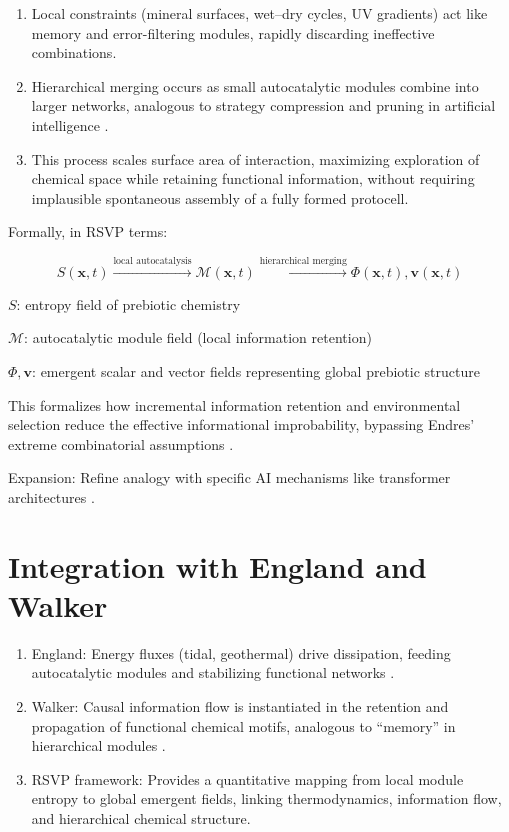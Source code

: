 \documentclass[openany]{book}
\begin{document}
\begin{enumerate}
\item Local constraints (mineral surfaces, wet–dry cycles, UV gradients) act like memory and error-filtering modules, rapidly discarding ineffective combinations.
\item Hierarchical merging occurs as small autocatalytic modules combine into larger networks, analogous to strategy compression and pruning in artificial intelligence \citep{scalinghypothesis}.
\item This process scales surface area of interaction, maximizing exploration of chemical space while retaining functional information, without requiring implausible spontaneous assembly of a fully formed protocell.
\end{enumerate}

Formally, in RSVP terms:

\[S(\mathbf{x}, t) \xrightarrow{\text{local autocatalysis}} \mathcal{M}(\mathbf{x}, t) \xrightarrow{\text{hierarchical merging}} \Phi(\mathbf{x}, t), \mathbf{v}(\mathbf{x}, t)\]

$S$: entropy field of prebiotic chemistry

$\mathcal{M}$: autocatalytic module field (local information retention)

$\Phi, \mathbf{v}$: emergent scalar and vector fields representing global prebiotic structure

This formalizes how incremental information retention and environmental selection reduce the effective informational improbability, bypassing Endres’ extreme combinatorial assumptions \citep{day2024}.

Expansion: Refine analogy with specific AI mechanisms like transformer architectures \citep{scalinghypothesis}.

\section{Integration with England and Walker}
\begin{enumerate}
\item England: Energy fluxes (tidal, geothermal) drive dissipation, feeding autocatalytic modules and stabilizing functional networks \citep{england2015}.
\item Walker: Causal information flow is instantiated in the retention and propagation of functional chemical motifs, analogous to “memory” in hierarchical modules \citep{walker2017}.
\item RSVP framework: Provides a quantitative mapping from local module entropy to global emergent fields, linking thermodynamics, information flow, and hierarchical chemical structure.
\end{enumerate}
\end{document}
